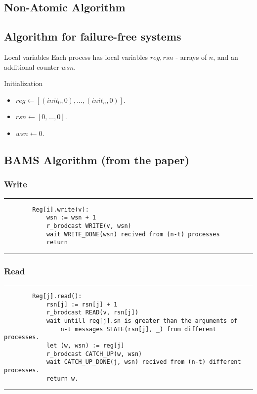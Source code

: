 \subsection{Non-Atomic Algorithm}
\begin{frame}
\end{frame}

\subsection{Algorithm for failure-free systems}
\begin{frame}
    \begin{block}{Local variables}
        Each process has local variables $reg, rsn$ - arrays of $n$, and 
        an additional counter $wsn$.
    \end{block}
    \begin{alertblock}{Initialization}
        \begin{itemize}
            \item $reg \leftarrow [(init_0, 0), ..., (init_n, 0)]$.
            \item $rsn \leftarrow [0, ..., 0]$.
            \item$wsn \leftarrow 0$.
        \end{itemize}
    \end{alertblock}
\end{frame}

\subsection{BAMS Algorithm (from the paper)}
\begin{frame}[fragile]
    \frametitle{Write}
    \rule{\textwidth}{1pt}
    \scriptsize
    \begin{verbatim}
        Reg[i].write(v):
            wsn := wsn + 1
            r_brodcast WRITE(v, wsn)
            wait WRITE_DONE(wsn) recived from (n-t) processes
            return
    \end{verbatim}
    \rule{\textwidth}{1pt}
\end{frame}

\begin{frame}[fragile]
    \frametitle{Read}
    \rule{\textwidth}{1pt}
    \scriptsize
    \begin{verbatim}
        Reg[j].read():
            rsn[j] := rsn[j] + 1
            r_brodcast READ(v, rsn[j])
            wait untill reg[j].sn is greater than the arguments of
                n-t messages STATE(rsn[j], _) from different processes.
            let (w, wsn) := reg[j]
            r_brodcast CATCH_UP(w, wsn)
            wait CATCH_UP_DONE(j, wsn) recived from (n-t) different processes.
            return w.
    \end{verbatim}
    \rule{\textwidth}{1pt}
\end{frame}

